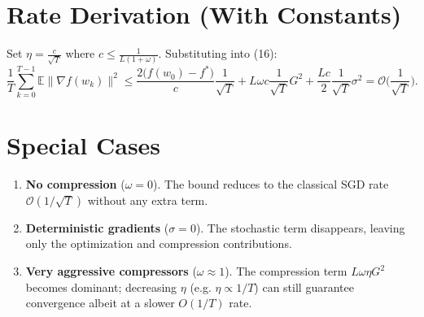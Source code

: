 \documentclass{article}
\newcommand{\E}{\mathbb{E}}
\begin{document}
\section*{Rate Derivation (With Constants)}
Set $\eta = \frac{c}{\sqrt{T}}$ where $c\le\frac{1}{L(1+\omega)}$.  Substituting into (16):
\[
\frac1T\sum_{k=0}^{T-1}\E\|\nabla f(w_{k})\|^{2}
\le
\frac{2\big(f(w_{0})-f^{*}\big)}{c}\frac{1}{\sqrt{T}}
+L\omega c\frac{1}{\sqrt{T}}G^{2}
+\frac{L c}{2}\frac{1}{\sqrt{T}}\sigma^{2}
= \mathcal O\!\Big(\frac{1}{\sqrt{T}}\Big).
\]

\section*{Special Cases}
\begin{enumerate}[label=(\alph*)]
    \item \textbf{No compression} ($\omega=0$).  The bound reduces to the classical SGD rate $\mathcal O(1/\sqrt{T})$ without any extra term.
    \item \textbf{Deterministic gradients} ($\sigma=0$).  The stochastic term disappears, leaving only the optimization and compression contributions.
    \item \textbf{Very aggressive compressors} ($\omega\approx1$).  The compression term $L\omega\eta G^{2}$ becomes dominant; decreasing $\eta$ (e.g. $\eta\propto 1/T$) can still guarantee convergence albeit at a slower $O(1/T)$ rate.
\end{enumerate}
\end{document}
